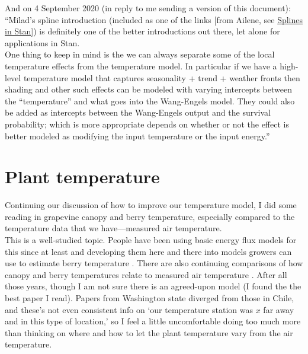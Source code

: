 \documentclass[11pt,letter]{article}
\begin{document}
And on 4 September 2020 (in reply to me sending a version of this document):\\

``Milad's spline introduction (included as one of the links [from Ailene, see \href{https://github.com/milkha/Splines_in_Stan/blob/master/splines_in_stan.pdf}{Splines in Stan}]) is definitely one of the better
introductions out there, let alone for applications in Stan.\\

One thing to keep in mind is the we can always separate some of the local temperature 
effects from the temperature model.  In particular if we have a high-level temperature 
model that captures seasonality + trend + weather fronts then shading and other such
effects can be modeled with varying intercepts between the ``temperature'' and what 
goes into the Wang-Engels model.  They could also be added as intercepts between 
the Wang-Engels output and the survival probability; which is more appropriate depends 
on whether or not the effect is better modeled as modifying the input temperature or the
input energy.''

\section{Plant temperature}

Continuing our discussion of how to improve our temperature model, I did some reading in grapevine canopy and berry temperature, especially compared to the temperature data that we have---measured air temperature. \\

This is a well-studied topic. People have been using basic energy flux models for this since at least \citet{millar1972} and developing them here and there into models growers can use to estimate berry temperature \citep[e.g.,][]{cola2009}. There are also continuing comparisons of how canopy and berry temperatures relate to measured air temperature \citep[e.g.,][]{costa2019,pena2020}. After all those years, though I am not sure there is an agreed-upon model (I found the \citet{millar1972} the best paper I read). Papers from Washington state diverged from those in Chile, and these's not even consistent info on `our temperature station was $x$ far away and in this type of location,' so I feel a little uncomfortable doing too much more than thinking on where and how to let the plant temperature vary from the air temperature. \\
\end{document}
